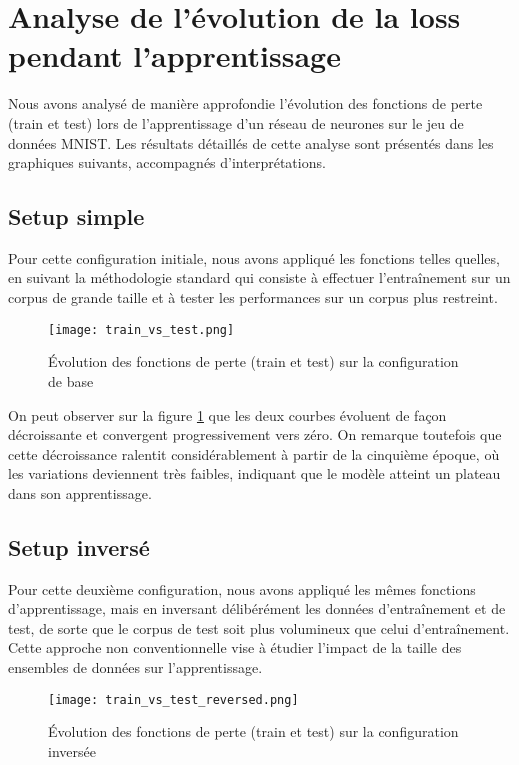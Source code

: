 \section{Analyse de l'évolution de la loss pendant l'apprentissage}

Nous avons analysé de manière approfondie l'évolution des fonctions de perte (train et test) lors de l'apprentissage d'un réseau de neurones sur le jeu de données MNIST. Les résultats détaillés de cette analyse sont présentés dans les graphiques suivants, accompagnés d'interprétations.

\subsection{Setup simple}

Pour cette configuration initiale, nous avons appliqué les fonctions telles quelles, en suivant la méthodologie standard qui consiste à effectuer l'entraînement sur un corpus de grande taille et à tester les performances sur un corpus plus restreint.

\begin{figure}[H]
    \centering
    \texttt{[image: train\_vs\_test.png]}
    \caption{Évolution des fonctions de perte (train et test) sur la configuration de base}
    \label{fig:train_vs_test}
\end{figure}

On peut observer sur la figure \ref{fig:train_vs_test} que les deux courbes évoluent de façon décroissante et convergent progressivement vers zéro. On remarque toutefois que cette décroissance ralentit considérablement à partir de la cinquième époque, où les variations deviennent très faibles, indiquant que le modèle atteint un plateau dans son apprentissage.

\newpage
\subsection{Setup inversé}

Pour cette deuxième configuration, nous avons appliqué les mêmes fonctions d'apprentissage, mais en inversant délibérément les données d'entraînement et de test, de sorte que le corpus de test soit plus volumineux que celui d'entraînement. Cette approche non conventionnelle vise à étudier l'impact de la taille des ensembles de données sur l'apprentissage.

\begin{figure}[H]
    \centering
    \texttt{[image: train\_vs\_test\_reversed.png]}
    \caption{Évolution des fonctions de perte (train et test) sur la configuration inversée}
    \label{fig:train_vs_test_reversed}
\end{figure}

